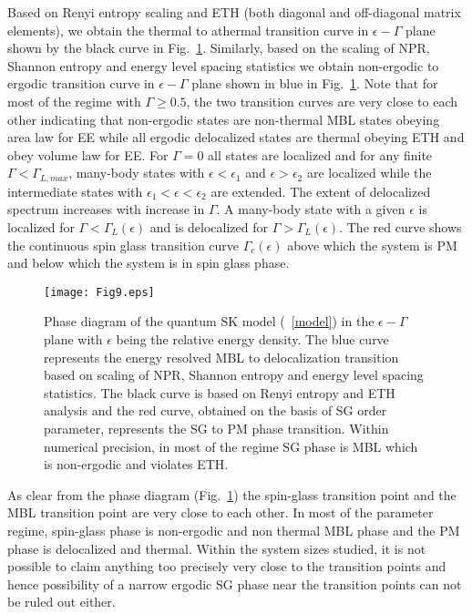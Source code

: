 \documentclass[prl,aps,twocolumn,floats,nofootinbib]{revtex4}
\begin{document}
Based on Renyi entropy scaling and ETH (both diagonal and off-diagonal matrix elements),  we obtain the thermal to athermal transition curve in $\epsilon-\Gamma$ plane shown by the black curve in Fig.~\ref{phase_diag}. Similarly, based on the scaling of NPR, Shannon entropy and energy level spacing statistics we obtain non-ergodic to ergodic transition curve in $\epsilon-\Gamma$ plane shown in blue in Fig.~\ref{phase_diag}. Note that for most of the regime with $\Gamma \ge 0.5$, the two transition curves are very close to each other indicating that non-ergodic states are non-thermal MBL states obeying area law for EE while all ergodic delocalized states are thermal obeying ETH and obey volume law for EE. For $\Gamma=0$ all states are localized and for any finite $\Gamma < \Gamma_{L,max}$, many-body states with $\epsilon < \epsilon_1$ and $\epsilon>\epsilon_2$ are localized while the intermediate states with $\epsilon_1<\epsilon<\epsilon_2$ are extended. The extent of delocalized spectrum increases with increase in $\Gamma$.  A many-body state with a given $\epsilon$ is localized for $\Gamma < \Gamma_L(\epsilon)$ and is delocalized for $\Gamma>\Gamma_{L}(\epsilon)$. The red curve shows the continuous spin glass transition curve $\Gamma_c(\epsilon)$ above which the system is PM and below which the system is in spin glass phase.
 \begin{figure}[h!]
\begin{center}
\hskip-0.4cm
\texttt{[image: Fig9.eps]}
\caption{Phase diagram of the quantum SK model (~\ref{model}) in the $\epsilon-\Gamma$ plane with $\epsilon$ being the relative energy density. The blue curve represents the energy resolved MBL to delocalization transition based on scaling of NPR, Shannon entropy and energy level spacing statistics. The black curve is based on Renyi entropy and ETH analysis  and the red curve, obtained on the basis of SG order parameter, represents the SG to PM phase transition. Within numerical precision, in most of the regime SG phase is MBL which is non-ergodic and violates ETH. 
 }
\label{phase_diag}
\end{center}
\end{figure}

As clear from the phase diagram (Fig.~\ref{phase_diag}) the spin-glass transition point and the MBL transition point are very close to each other. In most of the parameter regime, spin-glass phase is non-ergodic and non thermal MBL phase and the PM phase is delocalized and thermal. Within the system sizes studied, it is not possible to claim anything too precisely very close to the transition points and hence possibility of a narrow ergodic SG phase near the transition points can not be ruled out either. 
  
\end{document}
